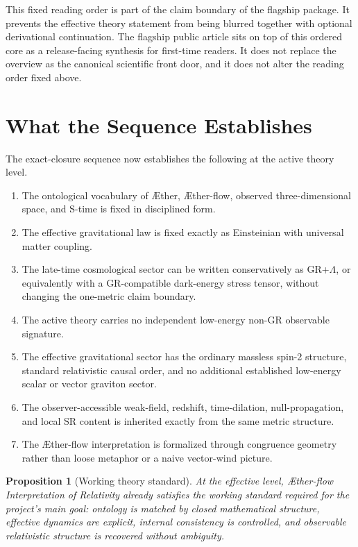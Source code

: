 \documentclass[11pt]{article}
\newcommand{\Aether}{\AE{}ther}
\newcommand{\Aflow}{\AE{}ther-flow}
\newcommand{\TheoryName}{\Aflow{} Interpretation of Relativity}
\newtheorem{proposition}{Proposition}
\begin{document}
This fixed reading order is part of the claim boundary of the flagship package. It prevents the effective theory statement from being blurred together with optional derivational continuation.
The flagship public article sits on top of this ordered core as a release-facing synthesis for first-time readers. It does not replace the overview as the canonical scientific front door, and it does not alter the reading order fixed above.

\section{What the Sequence Establishes}

The exact-closure sequence now establishes the following at the active theory level.
\begin{enumerate}
    \item The ontological vocabulary of \Aether{}, \Aflow{}, observed three-dimensional space, and S-time is fixed in disciplined form.
    \item The effective gravitational law is fixed exactly as Einsteinian with universal matter coupling.
    \item The late-time cosmological sector can be written conservatively as GR+\(\Lambda\), or equivalently with a GR-compatible dark-energy stress tensor, without changing the one-metric claim boundary.
    \item The active theory carries no independent low-energy non-GR observable signature.
    \item The effective gravitational sector has the ordinary massless spin-2 structure, standard relativistic causal order, and no additional established low-energy scalar or vector graviton sector.
    \item The observer-accessible weak-field, redshift, time-dilation, null-propagation, and local SR content is inherited exactly from the same metric structure.
    \item The \Aflow{} interpretation is formalized through congruence geometry rather than loose metaphor or a naive vector-wind picture.
\end{enumerate}

\begin{proposition}[Working theory standard]
At the effective level, \TheoryName{} already satisfies the working standard required for the project's main goal: ontology is matched by closed mathematical structure, effective dynamics are explicit, internal consistency is controlled, and observable relativistic structure is recovered without ambiguity.
\end{proposition}
\end{document}
